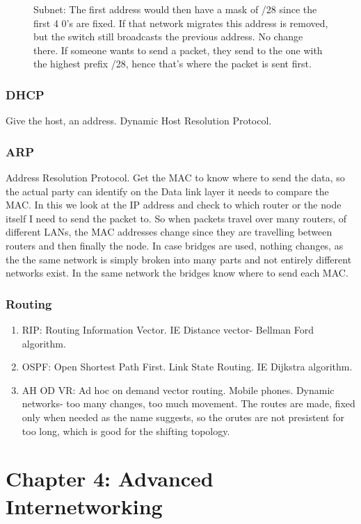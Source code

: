 \documentclass[12pt]{book}
\begin{document}
\begin{enumerate}
\begin{figure}[H]
        \caption{Subnet: The first address would then have a mask of /28 since the first 4 0's are fixed. If that network migrates this address is removed, but the switch still broadcasts the previous address. No change there. If someone wants to send a packet, they send to the one with the highest prefix /28, hence that's where the packet is sent first.}
        \label{fig:my_label}
    \end{figure}
\end{enumerate}
\subsection{DHCP}
Give the host, an address. Dynamic Host Resolution Protocol.

\subsection{ARP}
Address Resolution Protocol. Get the MAC to know where to send the data, so the actual party can identify on the Data link layer it needs to compare the MAC. In this we look at the IP address and check to which router or the node itself I need to send the packet to. So when packets travel over many routers, of different LANs, the MAC addresses change since they are travelling between routers and then finally the node. In case bridges are used, nothing changes, as the the same network is simply broken into many parts and not entirely different networks exist. In the same network the bridges know where to send each MAC.

\subsection{Routing}
\begin{enumerate}
    \item RIP: Routing Information Vector. IE Distance vector- Bellman Ford algorithm.
    \item OSPF: Open Shortest Path First. Link State Routing. IE Dijkstra algorithm.
    \item AH OD VR: Ad hoc on demand vector routing. Mobile phones. Dynamic networks- too many changes, too much movement. The routes are made, fixed only when needed as the name suggests, so the orutes are not presistent for too long, which is good for the shifting topology.
\end{enumerate}

\chapter{Chapter 4: Advanced Internetworking}
\end{document}
